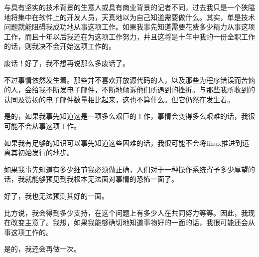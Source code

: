 与具有坚实的技术背景的生意人或具有商业背景的记者不同，过去我只是一个狭隘地将集中在软件上的开发人员，天真地以为自己知道需要做什么。其实，单是技术问题就能阻碍我成功地从事这项工作。如果我事先知道需要花费多少精力从事这项工作，而且十年以后我还在为这项工作努力，并且这将是十年中我的一份全职工作的话，则我决不会开始这项工作的。

废话！好了，我不想再说那么多废话了。

不过事情依然发生着。那些并不喜欢开放源代码的人，以及那些为程序错误而苦恼的人，会给我不断发电子邮件，不断地倾诉他们所遇到的挫折。与那些我所收到的认同及赞扬的电子邮件数量相比起来，这也不算什么。但它仍然在发生着。

是的，如果我事先知道这是一项多么艰巨的工作，事情会变得多么艰难的话，我很可能不会从事这项工作。

如果我有足够的知识可以事先知道这些困难的话，我很可能不会将linux推进到远离其初始发行的地步。

如果我事先知道有多少细节我必须做正确，人们对于一种操作系统寄予多少厚望的话，我就能够预见到我根本无法面对事情的恐怖一面了。

好了，我也无法预测其好的一面。

比方说，我会得到多少支持，在这个问题上有多少人在共同努力等等。因此，我现在改变主意了。我想，如果我能够确切地知道事物好的一面的话，我很可能还会从事这项工作的。

是的，我还会再做一次。
